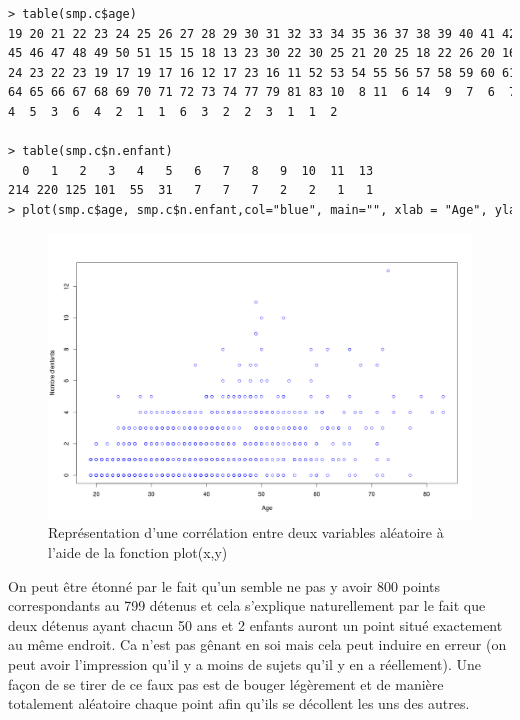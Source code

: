 \begin{lstlisting}[language=html]
> table(smp.c$age)
19 20 21 22 23 24 25 26 27 28 29 30 31 32 33 34 35 36 37 38 39 40 41 42 43 44 
45 46 47 48 49 50 51 15 15 18 13 23 30 22 30 25 21 20 25 18 22 26 20 16 18 25 
24 23 22 23 19 17 19 17 16 12 17 23 16 11 52 53 54 55 56 57 58 59 60 61 62 63 
64 65 66 67 68 69 70 71 72 73 74 77 79 81 83 10  8 11  6 14  9  7  6  7  5  7  
4  5  3  6  4  2  1  1  6  3  2  2  3  1  1  2 

> table(smp.c$n.enfant)
  0   1   2   3   4   5   6   7   8   9  10  11  13 
214 220 125 101  55  31   7   7   7   2   2   1   1 
> plot(smp.c$age, smp.c$n.enfant,col="blue", main="", xlab = "Age", ylab="Nombre d'enfants")
\end{lstlisting}
\begin{figure}[H]\begin{center}\includegraphics[scale=0.3]{ilu/tp6.png}\caption{Représentation d'une corrélation entre deux variables aléatoire à l'aide de la fonction plot(x,y)}\end{center}\end{figure}
On peut être étonné par le fait qu'un semble ne pas y avoir 800 points correspondants au 799 détenus et cela s'explique naturellement par le fait que deux détenus ayant chacun  50 ans et 2 enfants auront un point situé exactement au même endroit. Ca n'est pas gênant en soi mais cela peut induire en erreur (on peut avoir l'impression qu'il y a moins de sujets qu'il y en a réellement).\newline
Une façon de se tirer de ce faux pas est de bouger légèrement et de manière totalement aléatoire chaque point afin qu'ils se décollent les uns des autres.\newline
